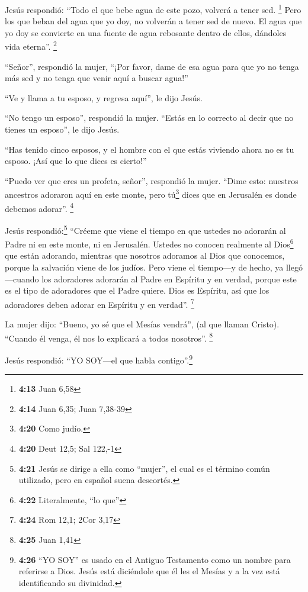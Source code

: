  Jesús respondió: ``Todo el que bebe agua de este pozo,
volverá a tener sed. \footnote{\textbf{4:13} Juan 6,58} 
Pero los que beban del agua que yo doy, no volverán a tener sed de
nuevo. El agua que yo doy se convierte en una fuente de agua rebosante
dentro de ellos, dándoles vida eterna''. \footnote{\textbf{4:14} Juan
  6,35; Juan 7,38-39}

 ``Señor'', respondió la mujer, ``¡Por favor, dame de esa
agua para que yo no tenga más sed y no tenga que venir aquí a buscar
agua!''

 ``Ve y llama a tu esposo, y regresa aquí'', le dijo
Jesús.

 ``No tengo un esposo'', respondió la mujer. ``Estás en
lo correcto al decir que no tienes un esposo'', le dijo Jesús.

 ``Has tenido cinco esposos, y el hombre con el que estás
viviendo ahora no es tu esposo. ¡Así que lo que dices es cierto!''

 ``Puedo ver que eres un profeta, señor'', respondió la
mujer.  ``Dime esto: nuestros ancestros adoraron aquí en
este monte, pero tú\footnote{\textbf{4:20} Como judío.} dices que en
Jerusalén es donde debemos adorar''. \footnote{\textbf{4:20} Deut 12,5;
  Sal 122,-1}

 Jesús respondió:\footnote{\textbf{4:21} Jesús se dirige
  a ella como ``mujer'', el cual es el término común utilizado, pero en
  español suena descortés.} ``Créeme que viene el tiempo en que ustedes
no adorarán al Padre ni en este monte, ni en Jerusalén. 
Ustedes no conocen realmente al Dios\footnote{\textbf{4:22}
  Literalmente, ``lo que''} que están adorando, mientras que nosotros
adoramos al Dios que conocemos, porque la salvación viene de los judíos.
 Pero viene el tiempo---y de hecho, ya llegó---cuando los
adoradores adorarán al Padre en Espíritu y en verdad, porque este es el
tipo de adoradores que el Padre quiere.  Dios es
Espíritu, así que los adoradores deben adorar en Espíritu y en verdad''.
\footnote{\textbf{4:24} Rom 12,1; 2Cor 3,17}

 La mujer dijo: ``Bueno, yo sé que el Mesías vendrá'',
(al que llaman Cristo). ``Cuando él venga, él nos lo explicará a todos
nosotros''. \footnote{\textbf{4:25} Juan 1,41}

 Jesús respondió: ``YO SOY---el que habla
contigo''.\footnote{\textbf{4:26} ``YO SOY'' es usado en el Antiguo
  Testamento como un nombre para referirse a Dios. Jesús está diciéndole
  que él les el Mesías y a la vez está identificando su divinidad.}

